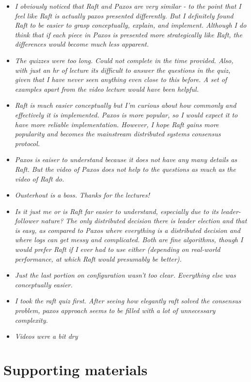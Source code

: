 \begin{enumerate}
\begin{itemize}
\item \emph{I obviously noticed that Raft and Paxos are very similar - to the point that I feel like Raft is actually paxos presented differently.  But I definitely found Raft to be easier to grasp conceptually, explain, and implement.  Although I do think that if each piece in Paxos is presented more strategically like Raft, the differences would become much less apparent.}
\item \emph{The quizzes were too long. Could not complete in the time provided. Also, with just an hr of lecture its difficult to answer the questions in the quiz, given that I have never seen anything even close to this before. A set of examples apart from the video lecture would have been helpful. }
\item \emph{Raft is much easier conceptually but I'm curious about how commonly and effectively it is implemented. Paxos is more popular, so I would expect it to have more reliable implementation. However, I hope Raft gains more popularity and becomes the mainstream distributed systems consensus protocol.}
\item \emph{Paxos is eaiser to understand because it does not have any many details as Raft. But the video of Paxos does not help to the questions as much as the video of Raft do.}
\item \emph{Ousterhout is a boss.  Thanks for the lectures!}
\item \emph{Is it just me or is Raft far easier to understand, especially due to its leader-follower nature? The only distributed decision there is leader election and that is easy, as compared to Paxos where everything is a distributed decision and where logs can get messy and complicated. Both are fine algorithms, though I would prefer Raft if I ever had to use either (depending on real-world performance, at which Raft would presumably be better).}
\item \emph{Just the last portion on configuration wasn't too clear. Everything else was conceptually easier.}
\item \emph{I took the raft quiz first. After seeing how elegantly raft solved the consensus problem, paxos approach seems to be filled with a lot of unnecessary complexity.}
\item \emph{Videos were a bit dry}
\end{itemize}


\section{Supporting materials}
\label{appendix:userstudy:supporting}


\end{enumerate}
